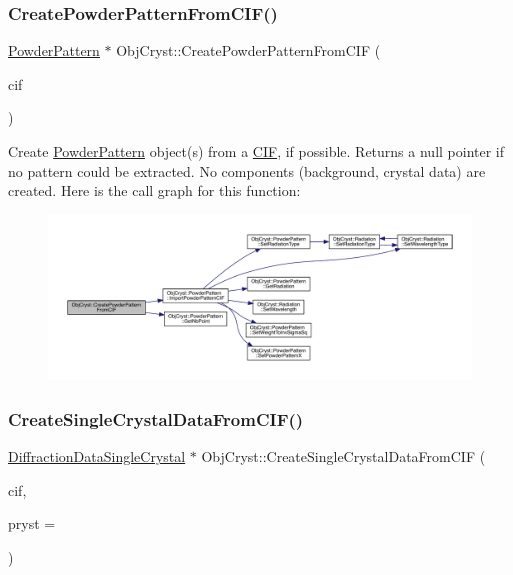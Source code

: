 \subsubsection{\texorpdfstring{CreatePowderPatternFromCIF()}{CreatePowderPatternFromCIF()}}
{\footnotesize\ttfamily \mbox{\hyperlink{class_obj_cryst_1_1_powder_pattern}{Powder\+Pattern}} $\ast$ Obj\+Cryst\+::\+Create\+Powder\+Pattern\+From\+C\+IF (\begin{DoxyParamCaption}\item[{\mbox{\hyperlink{class_obj_cryst_1_1_c_i_f}{C\+IF}} \&}]{cif }\end{DoxyParamCaption})}

Create \mbox{\hyperlink{class_obj_cryst_1_1_powder_pattern}{Powder\+Pattern}} object(s) from a \mbox{\hyperlink{class_obj_cryst_1_1_c_i_f}{C\+IF}}, if possible. Returns a null pointer if no pattern could be extracted. No components (background, crystal data) are created. Here is the call graph for this function\+:
\nopagebreak
\begin{figure}[H]
\begin{center}
\leavevmode
\includegraphics[width=350pt]{namespace_obj_cryst_adbcc0e73ad99ff2376a70f56f81366ed_cgraph}
\end{center}
\end{figure}
\mbox{\label{namespace_obj_cryst_a336ceab5acf3427d69f799599e47a976}} 
\subsubsection{\texorpdfstring{CreateSingleCrystalDataFromCIF()}{CreateSingleCrystalDataFromCIF()}}
{\footnotesize\ttfamily \mbox{\hyperlink{class_obj_cryst_1_1_diffraction_data_single_crystal}{Diffraction\+Data\+Single\+Crystal}} $\ast$ Obj\+Cryst\+::\+Create\+Single\+Crystal\+Data\+From\+C\+IF (\begin{DoxyParamCaption}\item[{\mbox{\hyperlink{class_obj_cryst_1_1_c_i_f}{C\+IF}} \&}]{cif,  }\item[{\mbox{\hyperlink{class_obj_cryst_1_1_crystal}{Crystal}} $\ast$}]{pryst = {} }\end{DoxyParamCaption})}

